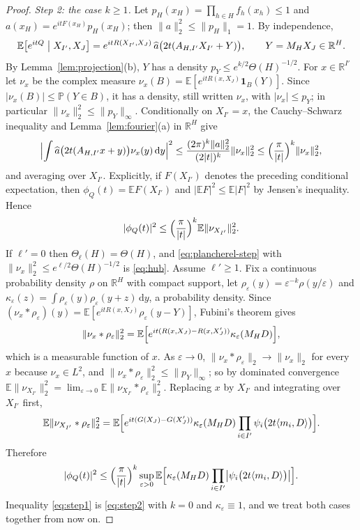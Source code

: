\documentclass[11pt]{amsart}
\numberwithin{equation}{section}
\theoremstyle{definition}
\theoremstyle{remark}
\newcommand{\R}{\mathbb R}
\newcommand{\E}{\mathbb E}
\newcommand{\PP}{\mathbb P}
\newcommand{\1}{\mathbf 1}
\newcommand{\dd}{\,\mathrm d}
\newcommand{\norm}[1]{\lVert #1\rVert}
\newcommand{\abs}[1]{\lvert #1\rvert}
\begin{document}
\begin{proof}
\emph{Step 2: the case $k\ge1$.} Let $p_H(x_H)=\prod_{h\in H}f_h(x_h)\le1$ and $a(x_H)=e^{itF(x_H)}p_H(x_H)$; then $\norm a_2^2\le\norm{p_H}_1=1$. By independence,
\[
\E\bigl[e^{itQ}\bigm|X_{I'},X_J\bigr]=e^{itR(X_{I'},X_J)}\,\widehat a\bigl(2t(A_{H,I'}X_{I'}+Y)\bigr),\qquad Y=M_HX_J\in\R^H.
\]
By Lemma~\ref{lem:projection}(b), $Y$ has a density $p_Y\le e^{k/2}\Theta(H)^{-1/2}$. For $x\in\R^{I'}$ let $\nu_x$ be the complex measure $\nu_x(B)=\E[e^{itR(x,X_J)}\1_B(Y)]$. Since $\abs{\nu_x(B)}\le\PP(Y\in B)$, it has a density, still written $\nu_x$, with $\abs{\nu_x}\le p_Y$; in particular $\norm{\nu_x}_2^2\le\norm{p_Y}_\infty$. Conditionally on $X_{I'}=x$, the Cauchy--Schwarz inequality and Lemma~\ref{lem:fourier}(a) in $\R^H$ give
\[
\Bigl\lvert\int\widehat a\bigl(2t(A_{H,I'}x+y)\bigr)\nu_x(y)\dd y\Bigr\rvert^2\le\frac{(2\pi)^k\norm a_2^2}{(2\abs t)^k}\norm{\nu_x}_2^2\le\Bigl(\frac\pi{\abs t}\Bigr)^k\norm{\nu_x}_2^2 ,
\]
and averaging over $X_{I'}$. Explicitly, if $F(X_{I'})$ denotes the preceding conditional expectation, then $\phi_Q(t)=\E F(X_{I'})$ and $\abs{\E F}^2\le\E\abs F^2$ by Jensen's inequality. Hence
\begin{equation}\label{eq:plancherel-step}
\abs{\phi_Q(t)}^2\le\Bigl(\frac\pi{\abs t}\Bigr)^k\E\norm{\nu_{X_{I'}}}_2^2 .
\end{equation}
If $\ell'=0$ then $\Theta_\ell(H)=\Theta(H)$, and \eqref{eq:plancherel-step} with $\norm{\nu_x}_2^2\le e^{\ell/2}\Theta(H)^{-1/2}$ is \eqref{eq:hub}. Assume $\ell'\ge1$. Fix a continuous probability density $\rho$ on $\R^H$ with compact support, let $\rho_\varepsilon(y)=\varepsilon^{-k}\rho(y/\varepsilon)$ and $\kappa_\varepsilon(z)=\int\rho_\varepsilon(y)\rho_\varepsilon(y+z)\dd y$, a probability density. Since $(\nu_x*\rho_\varepsilon)(y)=\E[e^{itR(x,X_J)}\rho_\varepsilon(y-Y)]$, Fubini's theorem gives
\[
\norm{\nu_x*\rho_\varepsilon}_2^2=\E\Bigl[e^{it(R(x,X_J)-R(x,X_J'))}\kappa_\varepsilon(M_HD)\Bigr],
\]
which is a measurable function of $x$. As $\varepsilon\to0$, $\norm{\nu_x*\rho_\varepsilon}_2\to\norm{\nu_x}_2$ for every $x$ because $\nu_x\in L^2$, and $\norm{\nu_x*\rho_\varepsilon}_2^2\le\norm{p_Y}_\infty$; so by dominated convergence $\E\norm{\nu_{X_{I'}}}_2^2=\lim_{\varepsilon\to0}\E\norm{\nu_{X_{I'}}*\rho_\varepsilon}_2^2$. Replacing $x$ by $X_{I'}$ and integrating over $X_{I'}$ first,
\[
\E\norm{\nu_{X_{I'}}*\rho_\varepsilon}_2^2=\E\Bigl[e^{it(G(X_J)-G(X_J'))}\kappa_\varepsilon(M_HD)\prod_{i\in I'}\psi_i\bigl(2t\langle m_i,D\rangle\bigr)\Bigr].
\]
Therefore
\begin{equation}\label{eq:step2}
\abs{\phi_Q(t)}^2\le\Bigl(\frac\pi{\abs t}\Bigr)^k\sup_{\varepsilon>0}\E\Bigl[\kappa_\varepsilon(M_HD)\prod_{i\in I'}\bigl\lvert\psi_i\bigl(2t\langle m_i,D\rangle\bigr)\bigr\rvert\Bigr].
\end{equation}
Inequality \eqref{eq:step1} is \eqref{eq:step2} with $k=0$ and $\kappa_\varepsilon\equiv1$, and we treat both cases together from now on.


\end{proof}
\end{document}
